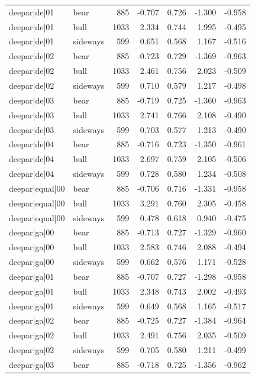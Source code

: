 \begin{table}
\begin{tabular}{llrrrrr}
deepar|de|01 & bear & 885 & -0.707 & 0.726 & -1.300 & -0.958 \\
deepar|de|01 & bull & 1033 & 2.334 & 0.744 & 1.995 & -0.495 \\
deepar|de|01 & sideways & 599 & 0.651 & 0.568 & 1.167 & -0.516 \\
deepar|de|02 & bear & 885 & -0.723 & 0.729 & -1.369 & -0.963 \\
deepar|de|02 & bull & 1033 & 2.461 & 0.756 & 2.023 & -0.509 \\
deepar|de|02 & sideways & 599 & 0.710 & 0.579 & 1.217 & -0.498 \\
deepar|de|03 & bear & 885 & -0.719 & 0.725 & -1.360 & -0.963 \\
deepar|de|03 & bull & 1033 & 2.741 & 0.766 & 2.108 & -0.490 \\
deepar|de|03 & sideways & 599 & 0.703 & 0.577 & 1.213 & -0.490 \\
deepar|de|04 & bear & 885 & -0.716 & 0.723 & -1.350 & -0.961 \\
deepar|de|04 & bull & 1033 & 2.697 & 0.759 & 2.105 & -0.506 \\
deepar|de|04 & sideways & 599 & 0.728 & 0.580 & 1.234 & -0.508 \\
deepar|equal|00 & bear & 885 & -0.706 & 0.716 & -1.331 & -0.958 \\
deepar|equal|00 & bull & 1033 & 3.291 & 0.760 & 2.305 & -0.458 \\
deepar|equal|00 & sideways & 599 & 0.478 & 0.618 & 0.940 & -0.475 \\
deepar|ga|00 & bear & 885 & -0.713 & 0.727 & -1.329 & -0.960 \\
deepar|ga|00 & bull & 1033 & 2.583 & 0.746 & 2.088 & -0.494 \\
deepar|ga|00 & sideways & 599 & 0.662 & 0.576 & 1.171 & -0.528 \\
deepar|ga|01 & bear & 885 & -0.707 & 0.727 & -1.298 & -0.958 \\
deepar|ga|01 & bull & 1033 & 2.348 & 0.743 & 2.002 & -0.493 \\
deepar|ga|01 & sideways & 599 & 0.649 & 0.568 & 1.165 & -0.517 \\
deepar|ga|02 & bear & 885 & -0.725 & 0.727 & -1.384 & -0.964 \\
deepar|ga|02 & bull & 1033 & 2.491 & 0.756 & 2.035 & -0.509 \\
deepar|ga|02 & sideways & 599 & 0.705 & 0.580 & 1.211 & -0.499 \\
deepar|ga|03 & bear & 885 & -0.718 & 0.725 & -1.356 & -0.962 \\

\end{tabular}
\end{table}
